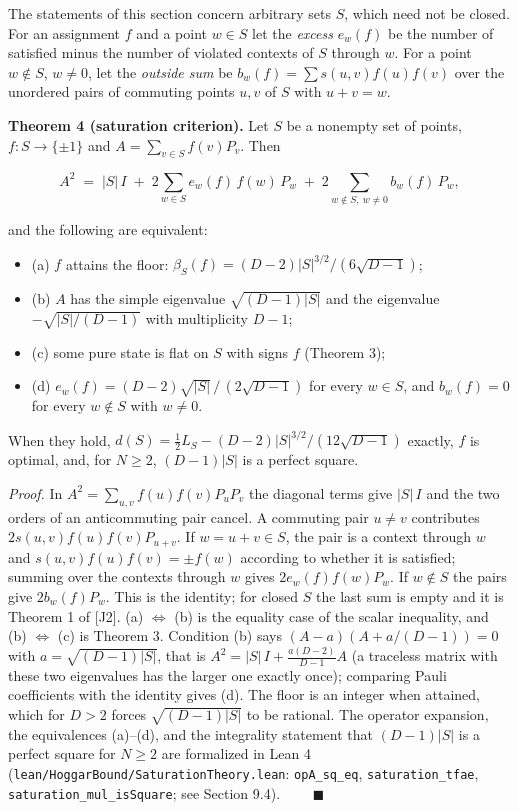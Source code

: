 \documentclass[11pt,a4paper]{article}
\providecommand{\tightlist}{\setlength{\itemsep}{0pt}\setlength{\parskip}{0pt}}
\newcommand{\gt}{>}
\begin{document}
The statements of this section concern arbitrary sets \(S\), which need not be closed. For an assignment
\(f\) and a point \(w \in S\) let the \emph{excess} \(e_w(f)\) be the number of satisfied minus the number of violated
contexts of \(S\) through \(w\). For a point \(w \notin S\), \(w \ne 0\), let the \emph{outside sum} be
\(b_w(f) = \sum s(u,v) f(u) f(v)\) over the unordered pairs of commuting points \(u, v\) of \(S\) with
\(u + v = w\).

\textbf{Theorem 4 (saturation criterion).} Let \(S\) be a nonempty set of points, \(f : S \to \{\pm1\}\) and
\(A = \sum_{v\in S} f(v) P_v\). Then

\[A^2 \;=\; |S|\, I \;+\; 2 \sum_{w \in S} e_w(f)\, f(w)\, P_w \;+\; 2 \sum_{w \notin S,\ w \neq 0} b_w(f)\, P_w ,\]

and the following are equivalent:

\begin{itemize}
\tightlist
\item
  (a) \(f\) attains the floor: \(\beta_S(f) = (D-2)|S|^{3/2}/(6\sqrt{D-1})\);
\item
  (b) \(A\) has the simple eigenvalue \(\sqrt{(D-1)|S|}\) and the eigenvalue \(-\sqrt{|S|/(D-1)}\) with multiplicity \(D-1\);
\item
  (c) some pure state is flat on \(S\) with signs \(f\) (Theorem 3);
\item
  (d) \(e_w(f) = (D-2)\sqrt{|S|}\,/\,(2\sqrt{D-1})\) for every \(w \in S\), and \(b_w(f) = 0\) for every \(w \notin S\) with \(w\ne0\).
\end{itemize}

When they hold, \(d(S) = \tfrac12 L_S - (D-2)|S|^{3/2}/(12\sqrt{D-1})\) exactly, \(f\) is optimal, and,
for \(N \ge 2\), \((D-1)|S|\) is a perfect square.

\emph{Proof.} In \(A^2 = \sum_{u,v} f(u)f(v)P_uP_v\) the diagonal terms give \(|S|\,I\) and the two orders of an
anticommuting pair cancel. A commuting pair \(u \ne v\) contributes \(2 s(u,v) f(u) f(v) P_{u+v}\). If
\(w = u+v \in S\), the pair is a context through \(w\) and \(s(u,v)f(u)f(v) = \pm f(w)\) according to whether it
is satisfied; summing over the contexts through \(w\) gives \(2 e_w(f) f(w) P_w\). If \(w \notin S\) the pairs
give \(2 b_w(f) P_w\). This is the identity; for closed \(S\) the last sum is empty and it is Theorem 1 of
{[}J2{]}. (a) \(\Leftrightarrow\) (b) is the equality case of the scalar inequality, and (b) \(\Leftrightarrow\) (c)
is Theorem 3. Condition (b) says \((A - a)(A + a/(D-1)) = 0\) with \(a = \sqrt{(D-1)|S|}\), that is
\(A^2 = |S|\,I + \tfrac{a(D-2)}{D-1} A\) (a traceless matrix with these two eigenvalues has the larger one
exactly once); comparing Pauli coefficients with the identity gives (d). The floor is an integer when
attained, which for \(D \gt 2\) forces \(\sqrt{(D-1)|S|}\) to be rational. The operator expansion, the
equivalences (a)--(d), and the integrality statement that \((D-1)|S|\) is a perfect square for \(N\ge2\) are
formalized in Lean 4 (\nolinkurl{lean/HoggarBound/SaturationTheory.lean}: \texttt{opA\_sq\_eq}, \texttt{saturation\_tfae},
\nolinkurl{saturation_mul_isSquare}; see Section 9.4). \(\qquad\blacksquare\)
\end{document}
